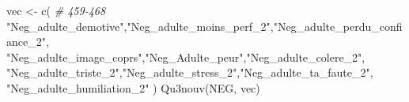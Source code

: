 \documentclass[
]{article}
\newenvironment{Shaded}{\begin{snugshade}}{\end{snugshade}}
\newcommand{\CommentTok}[1]{\textcolor[rgb]{0.56,0.35,0.01}{\textit{#1}}}
\newcommand{\FunctionTok}[1]{\textcolor[rgb]{0.00,0.00,0.00}{#1}}
\newcommand{\NormalTok}[1]{#1}
\newcommand{\OtherTok}[1]{\textcolor[rgb]{0.56,0.35,0.01}{#1}}
\newcommand{\StringTok}[1]{\textcolor[rgb]{0.31,0.60,0.02}{#1}}
\begin{document}
\begin{Shaded}
\begin{Highlighting}[]
\NormalTok{vec }\OtherTok{\textless{}{-}} \FunctionTok{c}\NormalTok{(  }\CommentTok{\# 459{-}468}
  \StringTok{"Neg\_adulte\_demotive"}\NormalTok{,}\StringTok{"Neg\_adulte\_moins\_perf\_2"}\NormalTok{,}\StringTok{"Neg\_adulte\_perdu\_confiance\_2"}\NormalTok{,}
  \StringTok{"Neg\_adulte\_image\_coprs"}\NormalTok{,}\StringTok{"Neg\_Adulte\_peur"}\NormalTok{,}\StringTok{"Neg\_adulte\_colere\_2"}\NormalTok{,}
  \StringTok{"Neg\_adulte\_triste\_2"}\NormalTok{,}\StringTok{"Neg\_adulte\_stress\_2"}\NormalTok{,}\StringTok{"Neg\_adulte\_ta\_faute\_2"}\NormalTok{,}
  \StringTok{"Neg\_adulte\_humiliation\_2"}
\NormalTok{  )}
\FunctionTok{Qu3nouv}\NormalTok{(NEG, vec)}
\end{Highlighting}
\end{Shaded}
\end{document}
